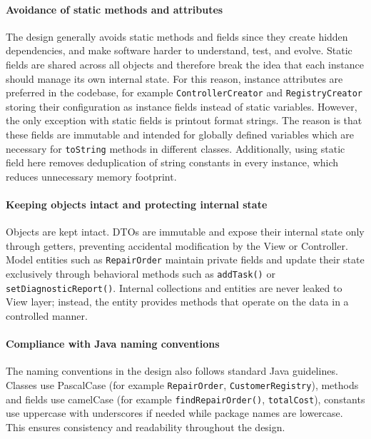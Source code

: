 \documentclass[a4paper]{scrartcl}
\begin{document}
\paragraph{Avoidance of static methods and attributes}
The design generally avoids static methods and fields since they create hidden dependencies, and make software harder to understand, test, and evolve. Static fields are shared across all objects and therefore break the idea that each instance should manage its own internal state. For this reason, instance attributes are preferred in the codebase, for example \texttt{ControllerCreator} and \texttt{RegistryCreator} storing their configuration as instance fields instead of static variables. However, the only exception with static fields is printout format strings. The reason is that these fields are immutable and intended for globally defined variables which are necessary for \texttt{toString} methods in different classes. Additionally, using static field here removes deduplication of string constants in every instance, which reduces unnecessary memory footprint.

\paragraph{Keeping objects intact and protecting internal state}
Objects are kept intact. DTOs are immutable and expose their internal state only through getters, preventing accidental modification by the View or Controller. Model entities such as \texttt{RepairOrder} maintain private fields and update their state exclusively through behavioral methods such as \texttt{addTask()} or \texttt{setDiagnosticReport()}. Internal collections and entities are never leaked to View layer; instead, the entity provides methods that operate on the data in a controlled manner.

\paragraph{Compliance with Java naming conventions}
The naming conventions in the design also follows standard Java guidelines. Classes use PascalCase (for example \texttt{RepairOrder}, \texttt{CustomerRegistry}), methods and fields use camelCase (for example \texttt{findRepairOrder()}, \texttt{totalCost}), constants use uppercase with underscores if needed while package names are lowercase. This ensures consistency and readability throughout the design.

\end{document}
